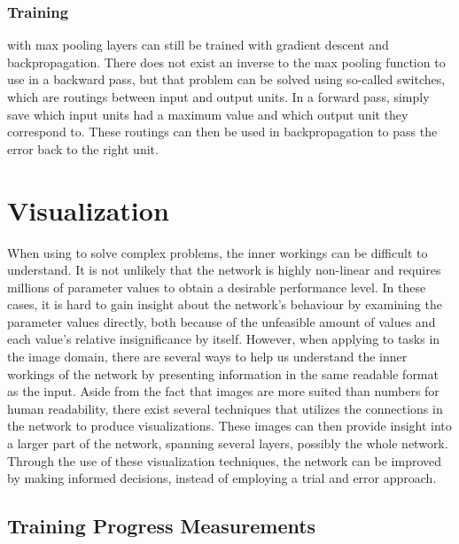 \subsubsection{Training}

 with max pooling layers can still be trained with gradient descent and backpropagation. There does not exist an inverse to the max pooling function to use in a backward pass, but that problem can be solved using so-called switches, which are routings between input and output units. In a forward pass, simply save which input units had a maximum value and which output unit they correspond to. These routings can then be used in backpropagation to pass the error back to the right unit.

\section{Visualization} \label{sec:visualization-theory}

When using  to solve complex problems, the inner workings can be difficult to understand. It is not unlikely that the network is highly non-linear and requires millions of parameter values to obtain a desirable performance level. In these cases, it is hard to gain insight about the network's behaviour by examining the parameter values directly, both because of the unfeasible amount of values and each value's relative insignificance by itself. However, when applying  to tasks in the image domain, there are several ways to help us understand the inner workings of the network by presenting information in the same readable format as the input. Aside from the fact that images are more suited than numbers for human readability, there exist several techniques that utilizes the connections in the network to produce visualizations. These images can then provide insight into a larger part of the network, spanning several layers, possibly the whole network. Through the use of these visualization techniques, the network can be improved by making informed decisions, instead of employing a trial and error approach. 

\subsection{Training Progress Measurements}

